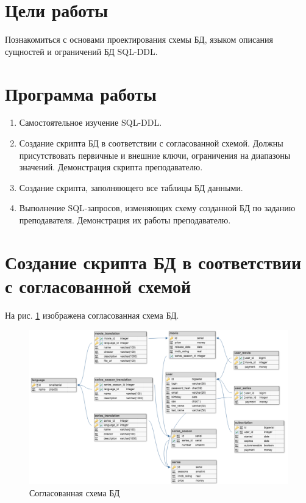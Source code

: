 





\tableofcontents
\newpage

\section{Цели работы}

Познакомиться с основами проектирования схемы БД, языком описания сущностей и ограничений БД SQL-DDL.

\section{Программа работы}

\begin{enumerate}
	\item Самостоятельное изучение SQL-DDL.
	\item Создание скрипта БД в соответствии с согласованной схемой. Должны присутствовать первичные и внешние ключи, ограничения на диапазоны значений. Демонстрация скрипта преподавателю. 
	\item Создание скрипта, заполняющего все таблицы БД данными.
	\item Выполнение SQL-запросов, изменяющих схему созданной БД по заданию преподавателя. Демонстрация их работы преподавателю.
\end{enumerate}
 
\section{Создание скрипта БД в соответствии с согласованной схемой} 
 
На рис. \ref{fig:movie-service-diagram-old} изображена согласованная схема БД.

\begin{figure}[H]
	\centering
	\includegraphics[width=1.0\textwidth]{../../lab1/diagrams/movie-service-diagram}
	\caption{Согласованная схема БД}
	\label{fig:movie-service-diagram-old}
\end{figure}

